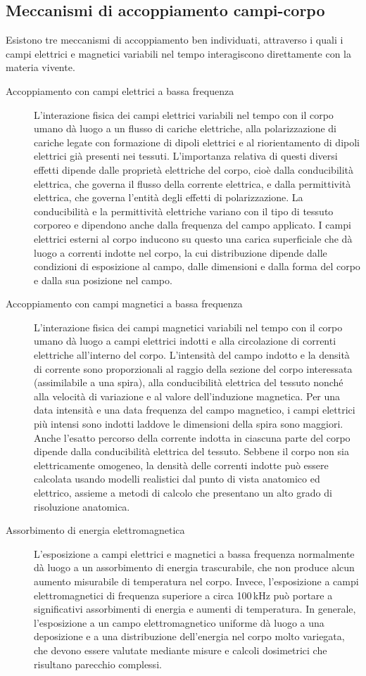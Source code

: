 \documentclass{report}
\numberwithin{equation}{section}
\numberwithin{figure}{section}
\begin{document}
\subsection{Meccanismi di accoppiamento campi-corpo}
Esistono tre meccanismi di accoppiamento ben individuati, attraverso i quali i campi elettrici e magnetici variabili nel tempo interagiscono direttamente con la materia vivente.
\begin{description}
    \item[Accoppiamento con campi elettrici a bassa frequenza] L’interazione fisica dei campi elettrici variabili nel tempo con il corpo umano dà luogo a un flusso di cariche elettriche, alla polarizzazione di cariche legate con formazione di dipoli elettrici e al riorientamento di dipoli elettrici già presenti nei tessuti. L’importanza relativa di questi diversi effetti dipende dalle proprietà elettriche del corpo, cioè dalla conducibilità elettrica, che governa il flusso della corrente elettrica, e dalla permittività elettrica, che governa l’entità degli effetti di polarizzazione. La conducibilità e la permittività elettriche variano con il tipo di tessuto corporeo e dipendono anche dalla frequenza del campo applicato. I campi elettrici esterni al corpo inducono su questo una carica superficiale che dà luogo a correnti indotte nel corpo, la cui distribuzione dipende dalle condizioni di esposizione al campo, dalle dimensioni e dalla forma del corpo e dalla sua posizione nel campo.
    \item[Accoppiamento con campi magnetici a bassa frequenza] L’interazione fisica dei campi magnetici variabili nel tempo con il corpo umano dà luogo a campi elettrici indotti e alla circolazione di correnti elettriche all'interno del corpo. L’intensità del campo indotto e la densità di corrente sono proporzionali al raggio della sezione del corpo interessata (assimilabile a una spira), alla conducibilità elettrica del tessuto nonché alla velocità di variazione e al valore dell'induzione magnetica. Per una data intensità e una data frequenza del campo magnetico, i campi elettrici più intensi sono indotti laddove le dimensioni della spira sono maggiori. Anche l’esatto percorso della corrente indotta in ciascuna parte del corpo dipende dalla conducibilità elettrica del tessuto. Sebbene il corpo non sia elettricamente omogeneo, la densità delle correnti indotte può essere calcolata usando modelli realistici dal punto di vista anatomico ed elettrico, assieme a metodi di calcolo che presentano un alto grado di risoluzione anatomica.
    \item[Assorbimento di energia elettromagnetica] L’esposizione a campi elettrici e magnetici a bassa frequenza normalmente dà luogo a un assorbimento di energia trascurabile, che non produce alcun aumento misurabile di temperatura nel corpo. Invece, l’esposizione a campi elettromagnetici di frequenza superiore a circa 100\,kHz può portare a significativi assorbimenti di energia e aumenti di temperatura. In generale, l’esposizione a un campo elettromagnetico uniforme dà luogo a una deposizione e a una distribuzione dell'energia nel corpo molto variegata, che devono essere valutate mediante misure e calcoli dosimetrici che risultano parecchio complessi.
\end{description}
\end{document}
